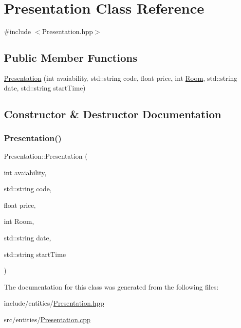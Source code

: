 \hypertarget{class_presentation}{}\section{Presentation Class Reference}
\label{class_presentation}


{\ttfamily \#include $<$Presentation.\+hpp$>$}

\subsection*{Public Member Functions}
\begin{DoxyCompactItemize}
\item 
\mbox{\hyperlink{class_presentation_abff3d184cf55070d7df7326154cae240}{Presentation}} (int avaiability, std\+::string code, float price, int \mbox{\hyperlink{class_room}{Room}}, std\+::string date, std\+::string start\+Time)
\end{DoxyCompactItemize}


\subsection{Constructor \& Destructor Documentation}
\mbox{\label{class_presentation_abff3d184cf55070d7df7326154cae240}} 
\subsubsection{\texorpdfstring{Presentation()}{Presentation()}}
{\footnotesize\ttfamily Presentation\+::\+Presentation (\begin{DoxyParamCaption}\item[{int}]{avaiability,  }\item[{std\+::string}]{code,  }\item[{float}]{price,  }\item[{int}]{Room,  }\item[{std\+::string}]{date,  }\item[{std\+::string}]{start\+Time }\end{DoxyParamCaption})}



The documentation for this class was generated from the following files\+:\begin{DoxyCompactItemize}
\item 
include/entities/\mbox{\hyperlink{_presentation_8hpp}{Presentation.\+hpp}}\item 
src/entities/\mbox{\hyperlink{_presentation_8cpp}{Presentation.\+cpp}}\end{DoxyCompactItemize}
